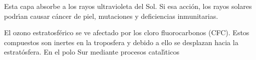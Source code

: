 Esta capa absorbe a los rayos ultravioleta del Sol. Si esa acci\'on, los rayos solares podr\'{\i}an causar c\'ancer de piel, mutaciones y deficiencias inmunitarias. 

El ozono estratosf\'erico se ve afectado por los cloro fluorocarbonos (CFC). Estos compuestos son inertes en la troposfera y debido a ello se desplazan hacia la estrat\'osfera. En el polo Sur mediante procesos catal\'{\i}ticos 


 